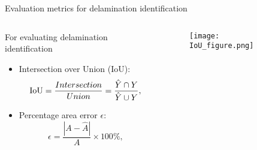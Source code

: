 \documentclass[10pt,aspectratio=169,dvipsnames]{beamer} %
\begin{document}
	\begin{frame}{Evaluation metrics for delamination identification}
		\begin{columns}[T]
			\begin{column}[c]{0.45\textwidth}
				For evaluating delamination identification
				\begin{itemize}
					\item Intersection over Union (IoU): %
					\begin{equation*}
						\textup{IoU}=\frac{Intersection}{Union}=\frac{\hat{Y} \cap Y}{\hat{Y} \cup Y},
						\label{eqn:iou}
					\end{equation*}
					\item Percentage area error $\epsilon$:
					\begin{equation*}
						\epsilon=\frac{|A-\hat{A}|}{A} \times 100\%,
						\label{eqn:mean_size_error}
					\end{equation*}
				\end{itemize}
			\end{column}
			\begin{column}[c]{0.45\textwidth}
				\begin{figure}
					\centering
					\texttt{[image: IoU\_figure.png]}			\end{figure}
			\end{column}
		\end{columns}
	\end{frame}
	
	
		
\end{document}
